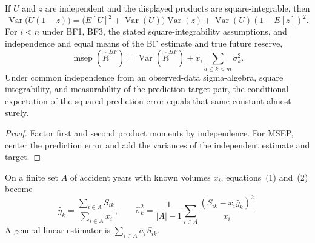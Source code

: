 \begin{theorem}\label{thm:bfPredictionError}\leanok
{}
If $U$ and $z$ are independent and the displayed products are
square-integrable, then
\[
 \operatorname{Var}\bigl(U(1-z)\bigr)
 =\bigl(E[U]^2+\operatorname{Var}(U)\bigr)\operatorname{Var}(z)
  +\operatorname{Var}(U)(1-E[z])^2.
\]
For $i<n$ under BF1, BF3, the stated square-integrability assumptions, and
independence and equal means of the BF estimate and true future reserve,
\[
 \operatorname{msep}(\widehat R^{BF})
 =\operatorname{Var}(\widehat R^{BF})
  +x_i\sum_{d\leq k<m}\sigma_k^2.
\]
Under common independence from an observed-data sigma-algebra, square integrability,
and measurability of the prediction-target pair, the conditional expectation of
the squared prediction error equals that same constant almost surely.
\end{theorem}
\begin{proof}\leanok Factor first and second product moments by independence.
For MSEP, center the prediction error and add the variances of the independent
estimate and target. \end{proof}

\begin{definition}\label{def:bfRaw}\leanok
On a finite set $A$ of accident years with known volumes $x_i$, equations~(1)
and~(2) become
\[
 \widehat y_k=\frac{\sum_{i\in A}S_{ik}}{\sum_{i\in A}x_i},\qquad
 \widehat\sigma_k^2=\frac1{|A|-1}\sum_{i\in A}
   \frac{(S_{ik}-x_i\widehat y_k)^2}{x_i}.
\]
A general linear estimator is $\sum_{i\in A}a_iS_{ik}$.
\end{definition}

